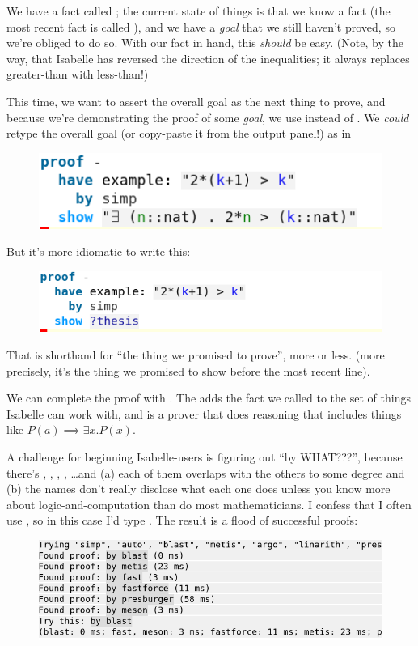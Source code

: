 We have a fact called ; the current state of things is that we know a fact (the most recent fact is called ), and we have a \textit{goal} that we still haven't proved, so we're obliged to do so. With our fact in hand, this \textit{should} be easy. (Note, by the way, that Isabelle has reversed the direction of the inequalities; it always replaces greater-than with less-than!)

This time, we want to assert the overall goal as the next thing to prove, and because we're demonstrating the proof of some \textit{goal}, we use  instead of . We \textit{could} retype the overall goal (or copy-paste it from the output panel!) as in 
\begin{figure}[h]
    \includegraphics[width=0.5\linewidth]{C01/Images/bad-show.png}
\end{figure}

But it's more idiomatic to write this:
\begin{figure}[H]
    \includegraphics[width=0.75\linewidth]{C01/Images/good-show.png}
\end{figure}

That  is shorthand for ``the thing we promised to prove'', more or less. (more precisely, it's the thing we promised to show before the most recent  line). 

We can complete the proof with . The  adds the fact we called  to the set of things Isabelle can work with, and  is a prover that does reasoning that includes things like $P(a) \implies \exists x . P(x)$.

A challenge for beginning Isabelle-users is figuring out ``by WHAT???'', because there's , , , , \ldots  and (a) each of them overlaps with the others to some degree and (b) the names don't really disclose what each one does unless you know more about logic-and-computation than do most mathematicians. I confess that I often use , so in this case I'd type . The result is a flood of successful proofs:
\begin{figure}[h]
    \includegraphics[width=0.75\linewidth]{C01/Images/flood.png}
\end{figure}

